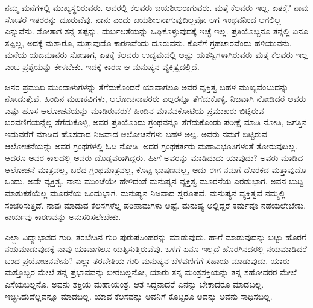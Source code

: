 ನಮ್ಮ ಮನೆಗಳಲ್ಲಿ ಮುಖ್ಯಸ್ಥರಿರುವರು. ಅವರಲ್ಲಿ ಕೆಲವರು ಜಯಶೀಲರಾಗುವರು. ಮತ್ತೆ ಕೆಲವರು ಇಲ್ಲ. ಏತಕ್ಕೆ? ನಾವು ಸೋತರೆ ಇತರರನ್ನು ದೂರುವೆವು. ನಾನು ಎಂದು ಜಯಶೀಲನಾಗುವುದಿಲ್ಲವೋ ಆಗ ಇಂಥವನಿಂದ ಆಗಲಿಲ್ಲ ಎನ್ನುವೆನು. ಸೋತಾಗ ತನ್ನ ತಪ್ಪನ್ನು, ದುರ್ಬಲತೆಯನ್ನು ಒಪ್ಪಿಕೊಳ್ಳುವುದಕ್ಕೆ ಇಚ್ಛೆ ಇಲ್ಲ. ಪ್ರತಿಯೊಬ್ಬನೂ ತನ್ನಲ್ಲಿ ಏನೂ ತಪ್ಪಿಲ್ಲ, ಅದಕ್ಕೆ ಮತ್ತಾರೊ, ಮತ್ತಾವುದೊ ಕಾರಣವೆಂದು ದೂರುವನು. ಕೊನೆಗೆ ಗ್ರಹಚಾರವೆಂದು ಹಳಿಯುವನು. ಮನೆಯ ಯಜಮಾನರು ಸೋತಾಗ, ಏತಕ್ಕೆ ಕೆಲವರು ಉದ್ಯಮದಲ್ಲಿ ಅಷ್ಟು ಯಶಸ್ವಿಗಳಾಗಿರುವರು ಮತ್ತೆ ಕೆಲವರು ಇಲ್ಲ ಎಂಬ ಪ್ರಶ್ನೆಯನ್ನು ಕೇಳಬೇಕು. ಇದಕ್ಕೆ ಕಾರಣ ಆ ಮನುಷ್ಯನ ವ್ಯಕ್ತಿತ್ವದಲ್ಲಿದೆ.

ಜನರ ಪ್ರಮುಖ ಮುಂದಾಳುಗಳನ್ನು ತೆಗೆದುಕೊಂಡರೆ ಯಾವಾಗಲೂ ಅವರ ವ್ಯಕ್ತಿತ್ವ ಬಹಳ ಮುಖ್ಯವೆಂಬುದನ್ನು ನೋಡುತ್ತೇವೆ. ಹಿಂದಿನ ಮಹಾಕವಿಗಳು, ಆಲೋಚನಾಪರರು ಎಲ್ಲರನ್ನೂ ತೆಗೆದುಕೊಳ್ಳಿ. ನಿಜವಾಗಿ ನೋಡಿದರೆ ಅವರು ಎಷ್ಟು ಹೊಸ ಆಲೋಚನೆಯನ್ನು ಮಾಡಿರುವರು? ಹಿಂದಿನ ಮಾನವಕೋಟಿಯ ಪ್ರಮುಖರು ಬಿಟ್ಟಿರುವ ಬರವಣಿಗೆಯನ್ನೆಲ್ಲ ತೆಗೆದುಕೊಳ್ಳಿ, ಅವರ ಪ್ರತಿಯೊಂದು ಗ್ರಂಥವನ್ನೂ ತೆಗೆದುಕೊಂಡು ಪರೀಕ್ಷೆ ಮಾಡಿ ನೋಡಿ, ಜಗತ್ತಿನ ಇದುವರೆಗೆ ಮಾಡಿದ ಹೊಸದಾದ ನಿಜವಾದ ಆಲೋಚನೆಗಳು ಬಹಳ ಅಲ್ಪ. ಅವರು ನಮಗೆ ಬಿಟ್ಟಿರುವ ಆಲೋಚನೆಯನ್ನು ಅವರ ಗ್ರಂಥಗಳಲ್ಲಿ ಓದಿ ನೋಡಿ. ಅದರ ಗ್ರಂಥಕರ್ತರು ಮಹಾವಿಭೂತಿಗಳಂತೆ ತೋರುವುದಿಲ್ಲ. ಆದರೂ ಅವರ ಕಾಲದಲ್ಲಿ ಅವರು ದೊಡ್ಡವರಾಗಿದ್ದರು. ಹೀಗೆ ಅವರನ್ನು ಮಾಡಿದುದು ಯಾವುದು? ಅವರು ಮಾಡಿದ ಆಲೋಚನೆ ಮಾತ್ರವಲ್ಲ, ಬರೆದ ಗ್ರಂಥಮಾತ್ರವಲ್ಲ, ಕೊಟ್ಟ ಭಾಷಣವಲ್ಲ, ಅದು ಈಗ ನಮಗೆ ದೊರಕದ ಮತ್ತಾವುದೊ ಒಂದು, ಅದೇ ವ್ಯಕ್ತಿತ್ವ. ನಾನು ಮುಂಚೆಯೇ ಹೇಳಿದಂತೆ ಮನುಷ್ಯನ ವ್ಯಕ್ತಿತ್ವ ಮೂರನೆಯ ಎರಡುಭಾಗ. ಅವನ ಬುದ್ದಿ ಮಾತುಕತೆಯೆಲ್ಲ ಮೂರನೆಯ ಒಂದುಭಾಗ. ಮನುಷ್ಯನ ನಿಜವಾದ ಸ್ವರೂಪವೆ, ಮನುಷ್ಯನ ವ್ಯಕ್ತಿತ್ವವೆ ನಮ್ಮಲ್ಲಿ ಸಂಚರಿಸುತ್ತಿದೆ. ನಾವು ಮಾಡುವ ಕೆಲಸಗಳೆಲ್ಲ ಪರಿಣಾಮಗಳು ಅಷ್ಟೆ. ಮನುಷ್ಯ ಅಲ್ಲಿದ್ದರೆ ಕರ್ಮವೂ ನಡೆಯಲೇಬೇಕು. ಕಾರ್ಯವು ಕಾರಣವನ್ನು ಅನುಸರಿಸಲೇಬೇಕು.

ಎಲ್ಲಾ ವಿದ್ಯಾಭಾಸದ ಗುರಿ, ತರಬೇತಿನ ಗುರಿ ಪುರುಷಸಿಂಹರನ್ನು ಮಾಡುವುದು. ಹಾಗೆ ಮಾಡುವುದನ್ನು ಬಿಟ್ಟು ಹೊರಗೆ ನಯಮಾಡುವುದಕ್ಕೆ ನಾವು ಯಾವಾಗಲೂ ಯತ್ನಿಸುತ್ತಿರುವೆವು. ಒಳಗೆ ಏನೂ ಇಲ್ಲದೆ ಹೊರಗಿನದರಲ್ಲಿ ನಯಮಾಡಿದರೆ ಬಂದ ಪ್ರಯೋಜನವೇನು? ಎಲ್ಲಾ ತರಬೇತಿಯ ಗುರಿ ಮನುಷ್ಯನ ಬೆಳವಣಿಗೆಗೆ ಸಹಾಯ ಮಾಡುವುದು. ಯಾರು ಮತ್ತೊಬ್ಬರ ಮೇಲೆ ತನ್ನ ಪ್ರಭಾವವನ್ನು ಬೀರಬಲ್ಲನೋ, ಯಾರು ತನ್ನ ಮಂತ್ರಶಕ್ತಿಯನ್ನು ತನ್ನ ಸಹೋದರರ ಮೇಲೆ ಎಸೆಯಬಲ್ಲನೊ, ಅವನು ಶಕ್ತಿಯ ಮಹಾಯಂತ್ರ. ಆತ ಸಿದ್ದನಾದರೆ ಏನನ್ನು ಬೇಕಾದರೂ ಮಾಡಬಲ್ಲ. ಇಚ್ಛಿಸಿದುದೆಲ್ಲವನ್ನೂ ಮಾಡಬಲ್ಲ. ಯಾವ ಕೆಲಸವನ್ನು ಅವನಿಗೆ ಕೊಟ್ಟರೂ ಅದನ್ನು ಅವನು ಸಾಧಿಸಬಲ್ಲ.

